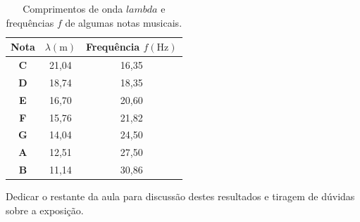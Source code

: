     \begin{table}[!ht]
        \centering
        \begin{tabular}{|c|c|c|}
        \hline
        \textbf{Nota} & \textbf{$\lambda(\textrm{m})$} & \textbf{Frequência $f(\textrm{Hz})$} \\ \hline
        \textbf{C}    & 21,04                          & 16,35                                \\ \hline
        \textbf{D}    & 18,74                          & 18,35                                \\ \hline
        \textbf{E}    & 16,70                          & 20,60                                \\ \hline
        \textbf{F}    & 15,76                          & 21,82                                \\ \hline
        \textbf{G}    & 14,04                          & 24,50                                \\ \hline
        \textbf{A}    & 12,51                          & 27,50                                \\ \hline
        \textbf{B}    & 11,14                          & 30,86                                \\ \hline
        \end{tabular}
        \caption{Comprimentos de onda $lambda$ e frequências $f$ de algumas notas musicais.}
        \label{tab:notas-musicais}
    \end{table}
    \vspace*{10pt}
    
    Dedicar o restante da aula para discussão destes resultados e tiragem de dúvidas sobre a exposição.